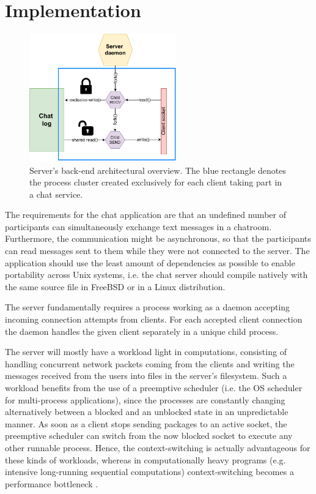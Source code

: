 \section{Implementation}
\begin{figure}[!t]
	\centering
	\includegraphics[width=2.5in]{img/server.pdf}
	\caption{Server's back-end architectural overview. The blue rectangle denotes the process cluster created exclusively for each client taking part in a chat service.}
	\label{fig_server_backend}
\end{figure}
The requirements for the chat application are that an undefined number of participants can simultaneously exchange text messages in a chatroom. Furthermore, the communication might be asynchronous, so that the participants can read messages sent to them while they were not connected to the server. The application should use the least amount of dependencies as possible to enable portability across Unix systems, i.e. the chat server should compile natively with the same source file in FreeBSD or in a Linux distribution.

The server fundamentally requires a process working as a daemon accepting incoming connection attempts from clients. For each accepted client connection the daemon handles the given client separately in a unique child process.

The server will mostly have a workload light in computations, consisting of handling concurrent network packets coming from the clients and writing the messages received from the users into files in the server's filesystem. Such a workload benefits from the use of a preemptive scheduler (i.e. the OS scheduler for multi-process applications), since the processes are constantly changing alternatively between a blocked and an unblocked state in an unpredictable manner. As soon as a client stops sending packages to an active socket, the preemptive scheduler can switch from the now blocked socket to execute any other runnable process. Hence, the context-switching is actually advantageous for these kinds of workloads, whereas in computationally heavy programs (e.g. intensive long-running sequential computations) context-switching becomes a performance bottleneck \cite{Kennedy2018}.

